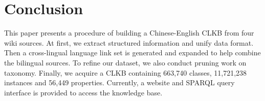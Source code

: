 \documentclass[runningheads,a4paper]{llncs}
\begin{document}
\section{Conclusion}
\label{sec:con}
This paper presents a procedure of building a Chinese-English CLKB from four wiki sources. At first, we extract structured information and unify data format. Then a cross-lingual language link set is generated and expanded to help combine the bilingual sources. To refine our dataset, we also conduct pruning work on taxonomy. Finally, we acquire a CLKB containing 663,740 classes, 11,721,238 instances and 56,449 properties. Currently, a website and SPARQL query interface is provided to access the knowledge base.





\end{document}
